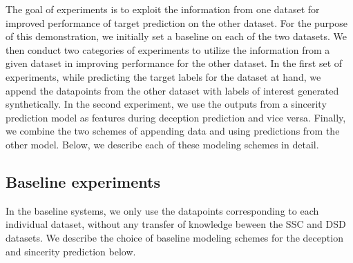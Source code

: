 \documentclass{article}
\begin{document}
The goal of experiments is to exploit the information from one dataset for improved performance of target prediction on the other dataset.
For the purpose of this demonstration, we initially set a baseline on each of the two datasets.
We then conduct two categories of experiments to utilize the information from a given dataset in improving performance for the other dataset. 
In the first set of experiments, while predicting the target labels for the dataset at hand, we append the datapoints from the other dataset with labels of interest generated synthetically. 
In the second experiment, we use the outputs from a sincerity prediction model as features during deception prediction and vice versa.
Finally, we combine the two schemes of appending data and using predictions from the other model.
Below, we describe each of these modeling schemes in detail. 

\subsection{Baseline experiments}

In the baseline systems, we only use the datapoints corresponding to each individual dataset, without any transfer of knowledge beween the SSC and DSD datasets.
We describe the choice of baseline modeling schemes for the deception and sincerity prediction below.
\\
\end{document}
